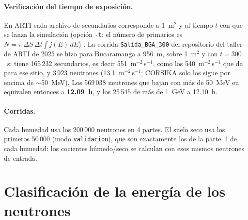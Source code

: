 \documentclass[11pt,a4paper]{article}
\newcommand{\tabla}[1]{}
\begin{document}
\paragraph{Verificación del tiempo de exposición.} En ARTI cada archivo de secundarios corresponde a 1~m$^2$ y al tiempo
$t$ con que se lanza la simulación (opción \texttt{-t}; el número de primarios es $N = \pi\,\Delta S\,\Delta t\int j(E)\,dE$)
\cite{Arti2022,Asorey2018}. La corrida \texttt{Salida\_BGA\_300} del repositorio del taller de ARTI de 2025
\cite{SarmientoCano2025repo} se hizo para Bucaramanga a 956~m, sobre 1~m$^2$ y con $t = 300$~s: tiene 165\,232
secundarios, es decir 551~m$^{-2}$\,s$^{-1}$, como los 540~m$^{-2}$\,s$^{-1}$ que da \cite{Arti2022} para ese sitio, y
3\,923 neutrones (13.1~m$^{-2}$\,s$^{-1}$; CORSIKA solo los sigue por encima de $\sim$50~MeV). Los 569\,038 neutrones que
bajan con más de 50~MeV en  equivalen entonces a \textbf{12.09~h}, y los 25\,545 de más de
1~GeV a 12.10~h. 

\paragraph{Corridas.} Cada humedad usa los 200\,000 neutrones en 4 partes. El suelo seco usa los primeros 50\,000
(modo \texttt{validacion}), que son exactamente los de la parte~1 de cada humedad: los cocientes húmedo/seco se calculan
con esos mismos neutrones de entrada.

\begin{table}[H]
	\centering\footnotesize
	\caption{Resumen de las características de las corridas. Neutrones: incidentes que cruzan el plano hacia abajo.}\label{tab:corridas}
\tabla{corridas}

\end{table}

\section{Clasificación de la energía de los neutrones}\label{sec:clasif}
\end{document}
